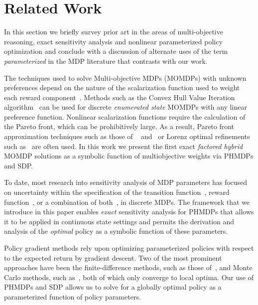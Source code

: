 \documentclass[letterpaper]{article}
\begin{document}
\section{Related Work}
\label{sec:background}

In this section we briefly survey prior art in the areas of multi-objective reasoning, exact sensitivity analysis and nonlinear parameterized policy optimization and conclude with a discussion of alternate uses of the term \emph{parameterized} in the MDP literature that contrasts with our work.

The techniques used to solve Multi-objective MDPs (MOMDPs) with unknown preferences depend on the nature of the scalarization function used to weight each reward component~\cite{Roijers_JAIR_2013}. Methods such as the Convex Hull Value Iteration algorithm~\cite{Barrett_ICML_2008} can be used for discrete \emph{enumerated state} MOMDPs with any linear preference function. Nonlinear scalarization functions require the calculation of the Pareto front, which can be prohibitively large. As a result, Pareto front approximation techniques such as those of ~\cite{Chatterjee_STACS_2006} and~\cite{Pirotta_AAAI_2015} or Lorenz optimal refinements such as~\cite{Perny_AAAI_2013} are often used. In this work we present the first exact \emph{factored hybrid} MOMDP solutions as a symbolic function of multiobjective weights via PHMDPs and SDP.

To date, most research into sensitivity analysis of MDP parameters has focused on uncertainty within the specification of the transition function~\cite{Kalyanasundaram_AJC_2004}, reward function~\cite{Tan_JAP_2011}, or a combination of both~\cite{Givan_AI_2000}, in discrete MDPs. The framework that we introduce in this paper enables \textit{exact} sensitivity analysis for PHMDPs that allows it to be applied in continuous state settings and permits the derivation and analysis of the \emph{optimal} policy as a symbolic function of these parameters.

Policy gradient methods rely upon optimizing parameterized policies with respect to the expected return by gradient descent. 
Two of the most prominent approaches have been the finite-difference methods, such as those of~\cite{Ng_UAI_2000}, and Monte Carlo methods, such as~\cite{Sutton_NIPS_1999,Baxter_ISCAS_2000}, both of which only converge to local optima.
Our use of PHMDPs and SDP allows us to solve for a globally optimal policy as a parameterized function of policy parameters.
\end{document}

